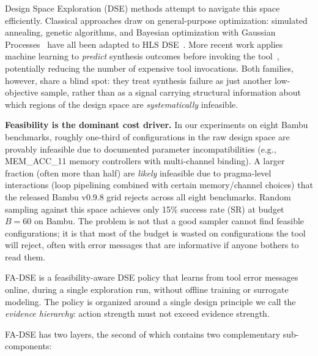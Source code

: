 \documentclass[journal]{IEEEtran}
\begin{document}
Design Space Exploration (DSE) methods attempt to navigate this space efficiently. Classical approaches draw on general-purpose optimization: simulated annealing, genetic algorithms, and Bayesian optimization with Gaussian Processes~\cite{snoek2012practical} have all been adapted to HLS DSE~\cite{ferretti2020cluster,ferretti2018lattice,liu2013learning}. More recent work applies machine learning to \emph{predict} synthesis outcomes before invoking the tool~\cite{wu2021ironman,sohrabizadeh2022automated,sohrabizadeh2023autoscaledse,kuang2023hgbo,koikeakino2024autohls}, potentially reducing the number of expensive tool invocations. Both families, however, share a blind spot: they treat synthesis failure as just another low-objective sample, rather than as a signal carrying structural information about which regions of the design space are \emph{systematically} infeasible.

\textbf{Feasibility is the dominant cost driver.} In our experiments on eight Bambu benchmarks, roughly one-third of configurations in the raw design space are provably infeasible due to documented parameter incompatibilities (e.g., MEM\_ACC\_11 memory controllers with multi-channel binding). A larger fraction (often more than half) are \emph{likely} infeasible due to pragma-level interactions (loop pipelining combined with certain memory/channel choices) that the released Bambu v0.9.8 grid rejects across all eight benchmarks. Random sampling against this space achieves only 15\% success rate (SR) at budget $B{=}60$ on Bambu. The problem is not that a good sampler cannot find feasible configurations; it is that most of the budget is wasted on configurations the tool will reject, often with error messages that are informative if anyone bothers to read them.

FA-DSE is a feasibility-aware DSE policy that learns from tool error messages online, during a single exploration run, without offline training or surrogate modeling. The policy is organized around a single design principle we call the \emph{evidence hierarchy}: action strength must not exceed evidence strength.

FA-DSE has two layers, the second of which contains two complementary sub-components:
\end{document}
